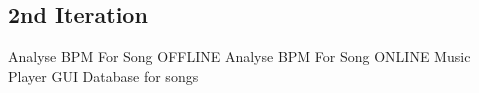 \subsection{2nd Iteration}
Analyse BPM For Song OFFLINE
Analyse BPM For Song ONLINE
Music Player GUI 
Database for songs